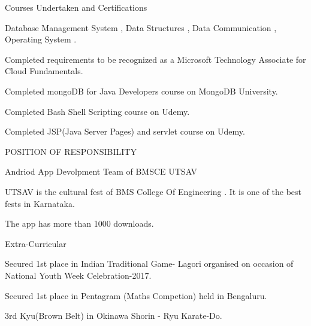 \documentclass{resume} %
\begin{document}

\begin{rSection}{Courses Undertaken and Certifications}
\begin{rSubsection}{}{}{}{}
\item Database Management System , Data Structures , Data Communication , Operating System .
\item Completed requirements to be recognized as a Microsoft Technology Associate for Cloud Fundamentals.
\item Completed mongoDB for Java Developers course on MongoDB University.
\item Completed Bash Shell Scripting course on Udemy.
\item Completed JSP(Java Server Pages) and servlet course on Udemy. 
\end{rSubsection}
\end{rSection}




\begin{rSection}{POSITION OF RESPONSIBILITY}

\begin{rSubsection}{Andriod App Devolpment Team of BMSCE UTSAV }{}{}{}
\item UTSAV is the cultural fest of BMS College Of Engineering .  It is one of the best fests in Karnataka.
\item The app has more than 1000 downloads.
\end{rSubsection}

\end{rSection}

\begin{rSection}{Extra-Curricular} \itemsep -3pt
\begin{rSubsection}{}{}{}{}
\item Secured 1st place in Indian Traditional Game- Lagori organised on occasion of National Youth Week Celebration-2017.
\item Secured 1st place in Pentagram (Maths Competion) held in Bengaluru.
\item 3rd Kyu(Brown Belt) in Okinawa Shorin - Ryu Karate-Do.
\end{rSubsection}
\end{rSection}
\end{document}
